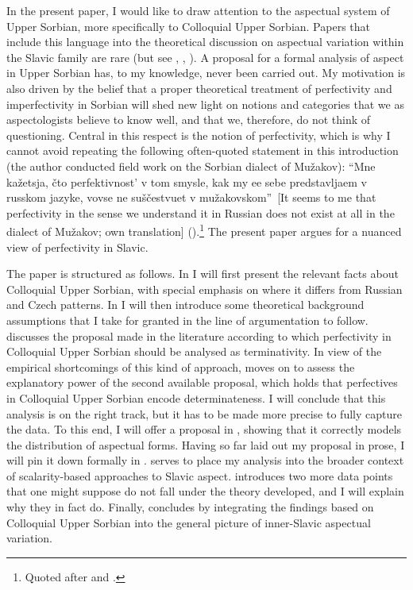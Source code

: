 \documentclass[output=paper,colorlinks,citecolor=brown]{langscibook}
\begin{document}
In the present paper, I would like to draw attention to the aspectual system of Upper Sorbian,
more specifically to Colloquial Upper Sorbian. Papers that include this language into the theoretical discussion on aspectual variation within the Slavic family are rare (but see \citealt{Breu00}, \citealt{Toops1998}, \citealt{Wiemer08}). A proposal for a formal analysis of aspect in Upper Sorbian has, to my knowledge, never been carried out. My motivation is also driven by the belief that a proper theoretical treatment of perfectivity and imperfectivity in Sorbian will shed new light on notions and categories that we as aspectologists believe to know well, and that we, therefore, do not think of  questioning. Central in this respect is the notion of perfectivity, which is why I cannot avoid repeating the following often-quoted statement in this introduction (the author conducted field work on the Sorbian dialect of Mužakov):
``Mne kažetsja, \v{c}to perfektivnost' v tom smysle, kak my ee sebe pred\-stavljaem v russkom jazyke, vovse ne suš\v{c}estvuet v mužakovskom''
    $\,$[It seems to me that perfectivity in the sense we understand it in Russian does not exist at all in the dialect of Mužakov; own translation] (\citealt[121]{Scerba1973}).\footnote{Quoted after \citet[230]{Scholze2008} and \citet[144]{Werner2018}.}
The present paper argues for a nuanced view of perfectivity in Slavic. 

The paper is structured as follows. In 
I will first present the relevant facts about Colloquial Upper Sorbian, with special emphasis on where it differs from Russian and Czech patterns. In  I will then introduce some theoretical background assumptions that I take for granted in the line of argumentation to follow.  discusses the proposal made in the literature according to which perfectivity in Colloquial Upper Sorbian should be analysed as terminativity. In view of the empirical shortcomings of this kind of approach,  moves on to assess the explanatory power of the second available proposal, which holds that perfectives in Colloquial Upper Sorbian encode determinateness. I will conclude that this analysis is on the right track, but it has to be made more precise to fully capture the data. To this end, I will offer a proposal in , showing that it correctly models the distribution of aspectual forms. Having so far laid out my proposal in prose, I will pin it down formally in .  serves to place my analysis into the broader context of scalarity-based approaches to Slavic aspect.  introduces two more data points that one might suppose do not fall under the theory developed, and I will explain why they in fact do.
Finally,  concludes by integrating the findings based on Colloquial Upper Sorbian into the general picture of inner-Slavic aspectual variation.
\end{document}
